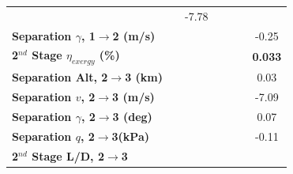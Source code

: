 \begin{table}[ht]
\begin{tabular}{l c c c c c c}
		& \firstsecondSeparationvmThreeOneHundredTenNoReturn
		&-7.78
		\\
		\textbf{Separation $\gamma$, 1$\rightarrow$2 (m/s)}
		& \firstsecondSeparationgammamThreeNinetyNoReturn
		& \firstsecondSeparationgammamThreeNinetyFiveNoReturn
		& \firstsecondSeparationgammamThreeStandardNoReturn
		& \firstsecondSeparationgammamThreeOneHundredFiveNoReturn
		& \firstsecondSeparationgammamThreeOneHundredTenNoReturn
		&-0.25
		\\
		\hline 
		\textbf{2$^{nd}$ Stage $\eta_{exergy}$ (\%)}
		& \textbf{\secondExergyEffmThreeNinetyNoReturn}
		& \textbf{\secondExergyEffmThreeNinetyFiveNoReturn}
		& \textbf{\secondExergyEffmThreeStandardNoReturn}
		& \textbf{\secondExergyEffmThreeOneHundredFiveNoReturn}
		& \textbf{\secondExergyEffmThreeOneHundredTenNoReturn}
		& \textbf{0.033}
		\\
		\textbf{Separation Alt, 2$\rightarrow$3 (km)}
		& \secondthirdSeparationAltmThreeNinetyNoReturn
		& \secondthirdSeparationAltmThreeNinetyFiveNoReturn
		& \secondthirdSeparationAltmThreeStandardNoReturn
		& \secondthirdSeparationAltmThreeOneHundredFiveNoReturn
		& \secondthirdSeparationAltmThreeOneHundredTenNoReturn
		&0.03
		\\
		\textbf{Separation $v$, 2$\rightarrow$3 (m/s)}
		& \secondthirdSeparationvmThreeNinetyNoReturn
		& \secondthirdSeparationvmThreeNinetyFiveNoReturn
		& \secondthirdSeparationvmThreeStandardNoReturn
		& \secondthirdSeparationvmThreeOneHundredFiveNoReturn
		& \secondthirdSeparationvmThreeOneHundredTenNoReturn
		&-7.09
		\\
		\textbf{Separation $\gamma$, 2$\rightarrow$3 (deg)}
		& \secondthirdSeparationgammamThreeNinetyNoReturn
		& \secondthirdSeparationgammamThreeNinetyFiveNoReturn
		& \secondthirdSeparationgammamThreeStandardNoReturn
		& \secondthirdSeparationgammamThreeOneHundredFiveNoReturn
		& \secondthirdSeparationgammamThreeOneHundredTenNoReturn
		&0.07
		\\
		\textbf{Separation $q$, 2$\rightarrow$3(kPa)}
		& \secondthirdSeparationqmThreeNinetyNoReturn
		& \secondthirdSeparationqmThreeNinetyFiveNoReturn
		& \secondthirdSeparationqmThreeStandardNoReturn
		& \secondthirdSeparationqmThreeOneHundredFiveNoReturn
		& \secondthirdSeparationqmThreeOneHundredTenNoReturn
		&-0.11
		\\
		\textbf{2$^{nd}$ Stage L/D, 2$\rightarrow$3}
		& \secondthirdSeparationLDmThreeNinetyNoReturn
		& \secondthirdSeparationLDmThreeNinetyFiveNoReturn
		& \secondthirdSeparationLDmThreeStandardNoReturn
		& \secondthirdSeparationLDmThreeOneHundredFiveNoReturn

\end{tabular}
\end{table}
